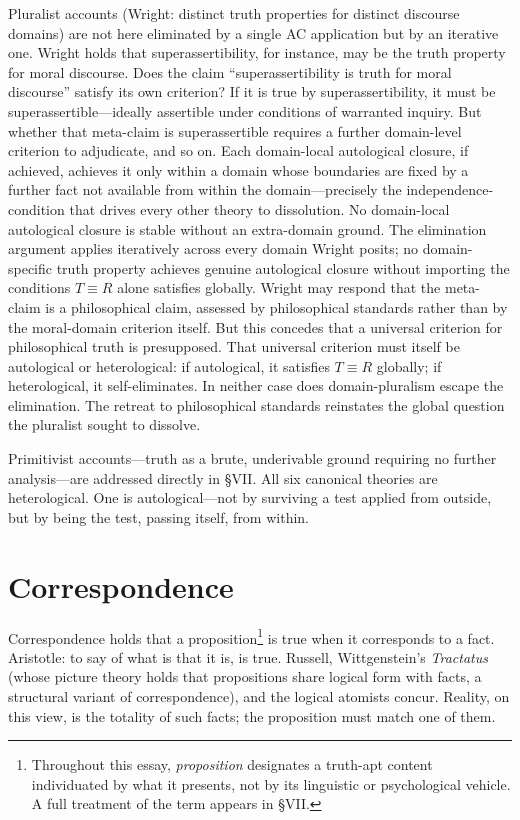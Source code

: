 \documentclass[11pt, oneside]{article}
\begin{document}
Pluralist accounts (Wright: distinct truth properties for distinct
discourse domains) are not here eliminated by a single AC application
but by an iterative one. Wright holds that superassertibility, for
instance, may be the truth property for moral discourse. Does the claim
``superassertibility is truth for moral discourse'' satisfy its own
criterion? If it is true by superassertibility, it must be
superassertible---ideally assertible under conditions of warranted
inquiry. But whether that meta-claim is superassertible requires a
further domain-level criterion to adjudicate, and so on. Each
domain-local autological closure, if achieved, achieves it only within
a domain whose boundaries are fixed by a further fact not available from
within the domain---precisely the independence-condition that drives
every other theory to dissolution. No domain-local autological closure
is stable without an extra-domain ground. The elimination argument
applies iteratively across every domain Wright posits; no
domain-specific truth property achieves genuine autological closure
without importing the conditions $T \equiv R$ alone satisfies globally.
Wright may respond that the meta-claim is a philosophical claim, assessed
by philosophical standards rather than by the moral-domain criterion
itself. But this concedes that a universal criterion for philosophical
truth is presupposed. That universal criterion must itself be autological
or heterological: if autological, it satisfies $T \equiv R$ globally; if
heterological, it self-eliminates. In neither case does domain-pluralism
escape the elimination. The retreat to philosophical standards reinstates
the global question the pluralist sought to dissolve.

Primitivist accounts---truth as a brute, underivable ground requiring no
further analysis---are addressed directly in \S VII. All six canonical
theories are heterological. One is autological---not by surviving a test
applied from outside, but by being the test, passing itself, from within.

\section{Correspondence}

Correspondence holds that a proposition\footnote{Throughout this essay, \textit{proposition} designates a truth-apt content individuated by what it presents, not by its linguistic or psychological vehicle. A full treatment of the term appears in \S VII.} is true when it corresponds to a
fact. Aristotle: to say of what is that it is, is true. Russell,
Wittgenstein's \textit{Tractatus} (whose picture theory holds that
propositions share logical form with facts, a structural variant of
correspondence), and the logical atomists concur. Reality, on this view,
is the totality of such facts; the proposition must match one of them.
\end{document}
